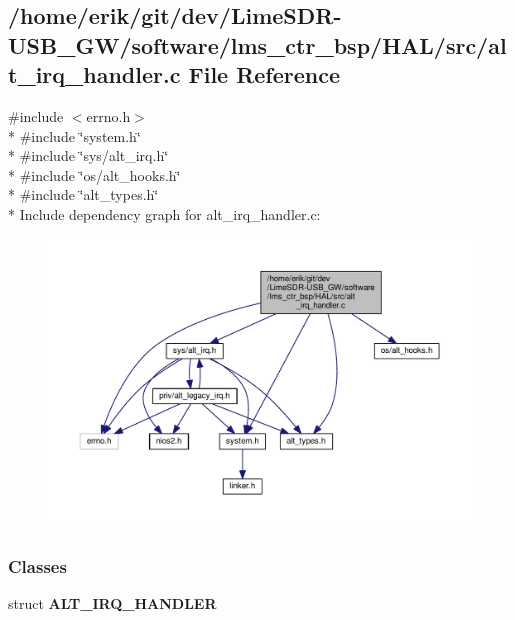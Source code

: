 \subsection{/home/erik/git/dev/\+Lime\+S\+D\+R-\/\+U\+S\+B\+\_\+\+G\+W/software/lms\+\_\+ctr\+\_\+bsp/\+H\+A\+L/src/alt\+\_\+irq\+\_\+handler.c File Reference}
\label{alt__irq__handler_8c}
{\ttfamily \#include $<$errno.\+h$>$}\\*
{\ttfamily \#include \char`\"{}system.\+h\char`\"{}}\\*
{\ttfamily \#include \char`\"{}sys/alt\+\_\+irq.\+h\char`\"{}}\\*
{\ttfamily \#include \char`\"{}os/alt\+\_\+hooks.\+h\char`\"{}}\\*
{\ttfamily \#include \char`\"{}alt\+\_\+types.\+h\char`\"{}}\\*
Include dependency graph for alt\+\_\+irq\+\_\+handler.\+c\+:
\nopagebreak
\begin{figure}[H]
\begin{center}
\leavevmode
\includegraphics[width=350pt]{d7/d1e/alt__irq__handler_8c__incl}
\end{center}
\end{figure}
\subsubsection*{Classes}
\begin{DoxyCompactItemize}
\item 
struct {\bf A\+L\+T\+\_\+\+I\+R\+Q\+\_\+\+H\+A\+N\+D\+L\+ER}
\end{DoxyCompactItemize}
